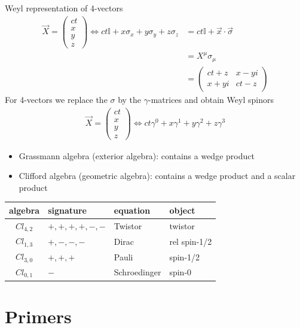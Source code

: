 \documentclass[10pt,a4paper]{book}
\theoremstyle{definition}
\begin{document}
Weyl representation of 4-vectors
\begin{align}
\vec{X}=
\left(
\begin{matrix}
ct\\
x\\
y\\
z
\end{matrix}
\right)
\Longleftrightarrow
ct\mathbb{I}+x\sigma_x+y\sigma_y+z\sigma_z
&=ct\mathbb{I}+\vec{x}\cdot\vec{\sigma}\\
&=X^\mu\sigma_\mu\\
&=\left(
\begin{matrix}
ct+z    & x-yi\\
x+yi &  ct-z
\end{matrix}
\right)
\end{align}
For 4-vectors we replace the $\sigma$ by the $\gamma$-matrices and obtain Weyl spinors
\begin{align}
\vec{X}=
\left(
\begin{matrix}
ct\\
x\\
y\\
z
\end{matrix}
\right)
\Longleftrightarrow
ct\gamma^0+x\gamma^1+y\gamma^2+z\gamma^3
\end{align}
 
\begin{itemize}
\item Grassmann algebra (exterior algebra): contains a wedge product
\item Clifford algebra (geometric algebra): contains a wedge product and a scalar product
\end{itemize}

\begin{center}
\begin{tabular}{ c lll}
 algebra    & signature     & equation     & object  \\ \hline  
 $Cl_{4,2}$ & $+,+,+,+,-,-$ & Twistor      & twistor \\  
 $Cl_{1,3}$ & $+,-,-,-$     & Dirac        & rel spin-1/2 \\  
 $Cl_{3,0}$ & $+,+,+$       & Pauli        & spin-1/2 \\  
 $Cl_{0,1}$ & $-$           & Schroedinger & spin-0   
\end{tabular}
\end{center}


\newpage
\chapter{Primers}
\end{document}
